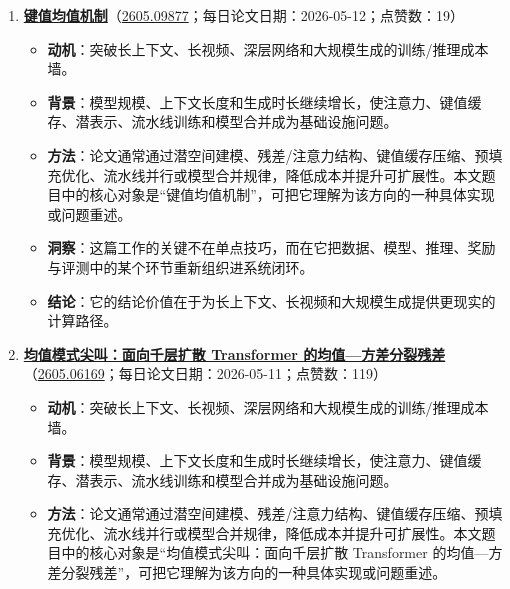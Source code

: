 \begin{enumerate}[leftmargin=1.5em]
\begin{itemize}[leftmargin=1.5em]
    \item \textbf{方法}：论文通常通过潜空间建模、残差/注意力结构、键值缓存压缩、预填充优化、流水线并行或模型合并规律，降低成本并提升可扩展性。本文题目中的核心对象是“记忆高效的循环 Transformer：在循环语言模型中解耦计算与记忆”，可把它理解为该方向的一种具体实现或问题重述。
    \item \textbf{洞察}：长期记忆不是简单追加上下文，而是需要压缩、权限、隐私和可更新状态共同设计。
    \item \textbf{结论}：它的结论价值在于为长上下文、长视频和大规模生成提供更现实的计算路径。
  \end{itemize}
  \item \textbf{\href{https://huggingface.co/papers/2605.09877}{键值均值机制}}（\href{https://arxiv.org/abs/2605.09877}{2605.09877}；每日论文日期：2026-05-12；点赞数：19）
  \begin{itemize}[leftmargin=1.5em]
    \item \textbf{动机}：突破长上下文、长视频、深层网络和大规模生成的训练/推理成本墙。
    \item \textbf{背景}：模型规模、上下文长度和生成时长继续增长，使注意力、键值缓存、潜表示、流水线训练和模型合并成为基础设施问题。
    \item \textbf{方法}：论文通常通过潜空间建模、残差/注意力结构、键值缓存压缩、预填充优化、流水线并行或模型合并规律，降低成本并提升可扩展性。本文题目中的核心对象是“键值均值机制”，可把它理解为该方向的一种具体实现或问题重述。
    \item \textbf{洞察}：这篇工作的关键不在单点技巧，而在它把数据、模型、推理、奖励与评测中的某个环节重新组织进系统闭环。
    \item \textbf{结论}：它的结论价值在于为长上下文、长视频和大规模生成提供更现实的计算路径。
  \end{itemize}
  \item \textbf{\href{https://huggingface.co/papers/2605.06169}{均值模式尖叫：面向千层扩散 Transformer 的均值—方差分裂残差}}（\href{https://arxiv.org/abs/2605.06169}{2605.06169}；每日论文日期：2026-05-11；点赞数：119）
  \begin{itemize}[leftmargin=1.5em]
    \item \textbf{动机}：突破长上下文、长视频、深层网络和大规模生成的训练/推理成本墙。
    \item \textbf{背景}：模型规模、上下文长度和生成时长继续增长，使注意力、键值缓存、潜表示、流水线训练和模型合并成为基础设施问题。
    \item \textbf{方法}：论文通常通过潜空间建模、残差/注意力结构、键值缓存压缩、预填充优化、流水线并行或模型合并规律，降低成本并提升可扩展性。本文题目中的核心对象是“均值模式尖叫：面向千层扩散 Transformer 的均值—方差分裂残差”，可把它理解为该方向的一种具体实现或问题重述。

\end{itemize}
\end{enumerate}

